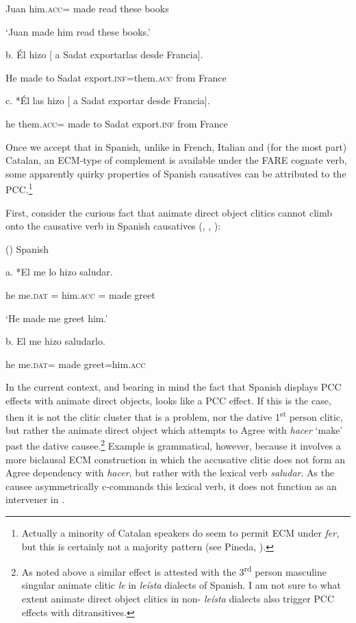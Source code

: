 \documentclass[output=paper,modfonts,nonflat]{langsci/langscibook}
\begin{document}
Juan him\textsc{.acc}=  made   read   these books

‘Juan made him read these books.’  

b.   Él  hizo  [  a   Sadat  exportarlas      desde   Francia].

He  made    to   Sadat  export.\textsc{inf}=them.\textsc{acc}   from   France

c.   *Él  las  hizo [  a   Sadat   exportar   desde   Francia].

  he them.\textsc{acc}=   made   to Sadat   export.\textsc{inf} from   France 

Once we accept that in Spanish, unlike in French, Italian and (for the most part) Catalan, an ECM-type of complement is available under the FARE cognate verb, some apparently quirky properties of Spanish causatives can be attributed to the PCC.\footnote{Actually a minority of Catalan speakers do seem to permit ECM under \textit{fer,} but this is certainly not a majority pattern (see Pineda, \citealt{SchifanoSheehan2018}).}  

First, consider the curious fact that animate direct object clitics cannot climb onto the causative verb in Spanish causatives (\citealt{Rivas1977}, \citealt{Bordelois1978}, \citealt{Torrego2010}):

()  Spanish \citep[463]{Torrego2010}

a.   *El   me     lo     hizo   saludar.

he   me.\textsc{dat} =  him.\textsc{acc} =  made greet

‘He made me greet him.’

b.   El   me     hizo   saludarlo.

he   me.\textsc{dat=}  made   greet=him.\textsc{acc}

In the current context, and bearing in mind the fact that Spanish displays PCC effects with animate direct objects,  looks like a PCC effect. If this is the case, then it is not the clitic cluster that is a problem, nor the dative 1\textsuperscript{st} person clitic, but rather the animate direct object which attempts to Agree with \textit{hacer} ‘make’ past the dative causee.\footnote{As noted above a similar effect is attested with the 3\textsuperscript{rd} person masculine singular animate clitic \textit{le} in \textit{leísta} dialects of Spanish. I am not sure to what extent animate direct object clitics in non- \textit{leísta} dialects also trigger PCC effects with ditransitives.  } Example  is grammatical, however, because it involves a more biclausal ECM construction in which the accusative clitic does not form an Agree dependency with \textit{hacer}, but rather with the lexical verb \textit{saludar}. As the causee asymmetrically c-commands this lexical verb, it does not function as an intervener in . 
\end{document}
